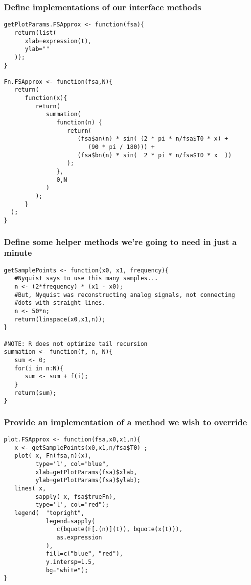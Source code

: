 \documentclass{beamer}
\begin{document}
\begin{frame}[fragile]
   \frametitle{Define implementations of our interface methods}
   \begin{center}
   \begin{minipage}{100mm}
   \begin{lstlisting}
getPlotParams.FSApprox <- function(fsa){
   return(list(
      xlab=expression(t),
      ylab=""
   ));
}

Fn.FSApprox <- function(fsa,N){
   return(
      function(x){
         return(
            summation(
               function(n) {
                  return(
                     (fsa$an(n) * sin( (2 * pi * n/fsa$T0 * x) + 
                        (90 * pi / 180))) +
                     (fsa$bn(n) * sin(  2 * pi * n/fsa$T0 * x  )) 
                  );
               }, 
               0,N
            )
         );
      }
  );
}
   \end{lstlisting}
   \end{minipage}
   \end{center}
\end{frame}

\begin{frame}[fragile]
   \frametitle{Define some helper methods we're going to need in just a minute}
   \begin{center}
   \begin{minipage}{100mm}
   \begin{lstlisting}
getSamplePoints <- function(x0, x1, frequency){
   #Nyquist says to use this many samples...
   n <- (2*frequency) * (x1 - x0);
   #But, Nyquist was reconstructing analog signals, not connecting 
   #dots with straight lines.
   n <- 50*n;
   return(linspace(x0,x1,n));
}

#NOTE: R does not optimize tail recursion
summation <- function(f, n, N){
   sum <- 0;
   for(i in n:N){
      sum <- sum + f(i);
   }
   return(sum);
}
   \end{lstlisting}
   \end{minipage}
   \end{center}
\end{frame}

\begin{frame}[fragile]
   \frametitle{Provide an implementation of a method we wish to override}
   \begin{center}
   \begin{minipage}{100mm}
   \begin{lstlisting}
plot.FSApprox <- function(fsa,x0,x1,n){
   x <- getSamplePoints(x0,x1,n/fsa$T0) ;
   plot( x, Fn(fsa,n)(x), 
         type='l', col="blue", 
         xlab=getPlotParams(fsa)$xlab, 
         ylab=getPlotParams(fsa)$ylab);
   lines( x, 
         sapply( x, fsa$trueFn),
         type='l', col="red");
   legend(  "topright", 
            legend=sapply(
               c(bquote(F[.(n)](t)), bquote(x(t))),
               as.expression
            ), 
            fill=c("blue", "red"),
            y.intersp=1.5,
            bg="white");
}
   \end{lstlisting}
   \end{minipage}
   \end{center}
\end{frame}
\end{document}
